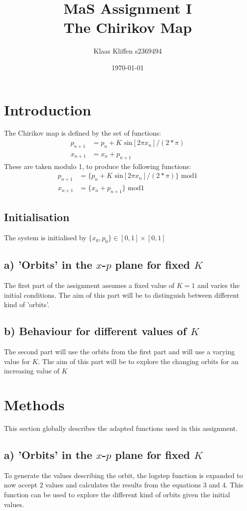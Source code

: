 \documentclass{article}
\title{MaS Assignment I\\
\large The Chirikov Map}
\author{Klaas Kliffen s2369494}
\date{\today}
\begin{document}
\maketitle

\section{Introduction}

The Chirikov map is defined by the set of functions:
\begin{align} 
p_{n+1} &= p_n + K \text{ sin}[2\pi x_n] / (2*\pi)\\
x_{n+1} &= x_n + p_{n+1}
\end{align}
These are taken modulo 1, to produce the following functions:
\begin{align} 
p_{n+1} &= \{p_n + K \text{ sin}[2\pi x_n] / (2*\pi)\} \text{ mod} 1\\ 
x_{n+1} &= \{x_n + p_{n+1}\} \text{ mod} 1
\end{align}

\subsection*{Initialisation}
The system is initialised by $\{x_0,p_0\} \in [0,1] \times [0,1]$

\subsection*{a) 'Orbits' in the $x$-$p$ plane for fixed $K$}
The first part of the assignment assumes a fixed value of $K = 1$ and varies the initial conditions. The aim of this part will be to distinguish between different kind of 'orbits'.

\subsection*{b) Behaviour for different values of $K$}
The second part will use the orbits from the first part and will use a varying value for $K$.
The aim of this part will be to explore the changing orbits for an increasing value of $K$


\section{Methods}
This section globally describes the adapted functions used in this assignment.

\subsection*{a) 'Orbits' in the $x$-$p$ plane for fixed $K$}
To generate the values describing the orbit, the logstep function is expanded to now accept 2 values and calculates the results from the equations 3 and 4.
This function can be used to explore the different kind of orbits given the initial values.
\end{document}
